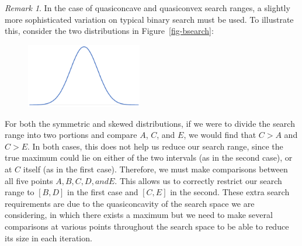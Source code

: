 \documentclass[
  letterpaper,
  numbers=noenddot,
  DIV=11]{scrreprt}
\theoremstyle{definition}
\theoremstyle{plain}
\theoremstyle{plain}
\theoremstyle{remark}
\newtheorem{refremark}{Remark}[chapter]
\begin{document}
\begin{tcolorbox}[colframe=.grey, title=\faQuestion \enspace Remark]

\begin{refremark}
In the case of quasiconcave and quasiconvex search ranges, a slightly
more sophisticated variation on typical binary search must be used. To
illustrate this, consider the two distributions in
Figure~\ref{fig-bsearch}:

\begin{figure}[H]

\begin{minipage}{0.50\linewidth}

\includegraphics[width=0.45\textwidth,height=\textheight]{src/Figures/normaldistribution.png}

\end{minipage}%

\end{figure}%

For both the symmetric and skewed distributions, if we were to divide
the search range into two portions and compare \(A\), \(C\), and \(E\),
we would find that \(C > A\) and \(C > E\). In both cases, this does not
help us reduce our search range, since the true maximum could lie on
either of the two intervals (as in the second case), or at \(C\) itself
(as in the first case). Therefore, we must make comparisons between all
five points \(A, B, C, D, and E\). This allows us to correctly restrict
our search range to \([B, D]\) in the first case and \([C, E]\) in the
second. These extra search requirements are due to the quasiconcavity of
the search space we are considering, in which there exists a maximum but
we need to make several comparisons at various points throughout the
search space to be able to reduce its size in each iteration.

\label{rem-explaination_binary_search}

\end{refremark}

\end{tcolorbox}
\end{document}
